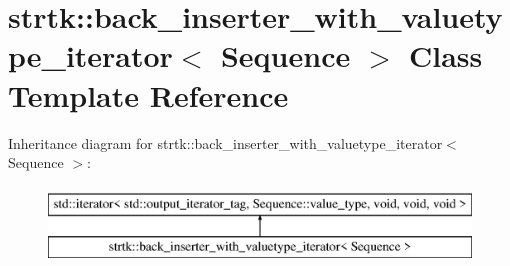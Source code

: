 \hypertarget{classstrtk_1_1back__inserter__with__valuetype__iterator}{\section{strtk\-:\-:back\-\_\-inserter\-\_\-with\-\_\-valuetype\-\_\-iterator$<$ Sequence $>$ Class Template Reference}
\label{classstrtk_1_1back__inserter__with__valuetype__iterator}
}
Inheritance diagram for strtk\-:\-:back\-\_\-inserter\-\_\-with\-\_\-valuetype\-\_\-iterator$<$ Sequence $>$\-:\begin{figure}[H]
\begin{center}
\leavevmode
\includegraphics[height=2.000000cm]{classstrtk_1_1back__inserter__with__valuetype__iterator}
\end{center}
\end{figure}
